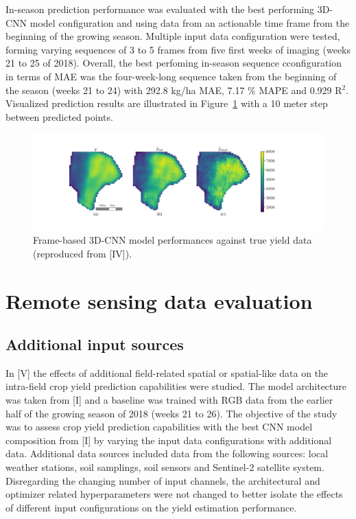 In-season prediction performance was evaluated with the best performing 3D-CNN model configuration and using data from an actionable time frame from the beginning of the growing season. Multiple input data configuration were tested, forming varying sequences of 3 to 5 frames from five first weeks of imaging (weeks 21 to 25 of 2018). Overall, the best perfoming in-season sequence cconfiguration in terms of MAE was the four-week-long sequence taken from the beginning of the season (weeks 21 to 24) with 292.8 kg/ha MAE, 7.17 \% MAPE and 0.929 R$^2$. Visualized prediction results are illustrated in Figure~\ref{fig:iv-true-pred} with a 10 meter step between predicted points. 

\begin{figure}[htb]
    \centering
    \includegraphics[width = \textwidth]{images/iv-true_pred.png}
    \caption{Frame-based 3D-CNN model performances against true yield data (reproduced from [IV]).}
    \label{fig:iv-true-pred}
\end{figure}

\section{Remote sensing data evaluation}
\label{sec:input-assessment-results}


\subsection{Additional input sources}
\label{subsec:additional-inputs-results}

In [V] the effects of additional field-related spatial or spatial-like data on the intra-field crop yield prediction capabilities were studied. The model architecture was taken from [I] and a baseline was trained with RGB data from the earlier half of the growing season of 2018 (weeks 21 to 26). The objective of the study was to assess crop yield prediction capabilities with the best CNN model composition from [I] by varying the input data configurations with additional data. Additional data sources included data from the following sources: local weather stations, soil samplings, soil sensors and Sentinel-2 satellite system. Disregarding the changing number of input channels, the architectural and optimizer related hyperparameters were not changed to better isolate the effects of different input configurations on the yield estimation performance.

